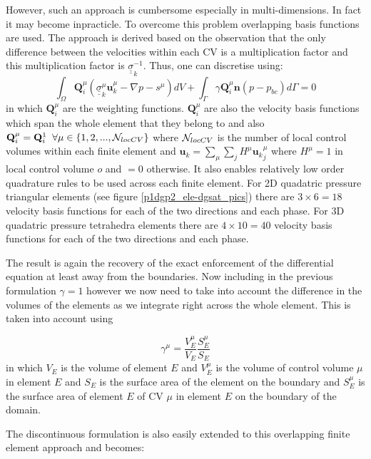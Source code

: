 However, such an approach is cumbersome especially in multi-dimensions.
In fact it may become inpracticle. To overcome this
problem overlapping basis functions are used. The approach is derived
based on the observation
that the only difference between the velocities
within each CV is a multiplication factor
and this multiplication factor is ${\underline {\underline \sigma}}_k^{-1}$.
Thus, one can discretise
using:
\begin{equation}
\int_\Omega {\mathbf Q}_i^\mu ({\underline{\underline\sigma}}_k^\mu {\mathbf u}_k^\mu - \nabla p -s^\mu) dV +
\int_{\Gamma}\gamma {\mathbf Q}_i^\mu {\mathbf n} (p-p_{bc}) d\Gamma =0
\label{overlap-eqn}
\end{equation}
in which ${\mathbf Q}_i^\mu$ are the weighting functions.
${\mathbf Q}_i^\mu$ are also the
velocity basis functions which span the whole
element that they belong to
and also ${\mathbf Q}_i^\mu={\mathbf Q}_i^1\;\; \forall \mu\in\{1,2,...,{\cal N}_{locCV}\}$
where ${\cal N}_{locCV}$ is the number of local control volumes within each
finite element and ${\mathbf u}_k =\sum_\mu \sum_j H^\mu {{\mathbf u}_k}_j^\mu$ where
$H^\mu=1$ in local control volume $o$ and $=0$ otherwise.
It also enables relatively low order quadrature rules to be used
across each finite element.
For 2D quadatric pressure triangular elements (see figure \ref{p1dgp2_ele-dgsat_pics})
there are $3\times6=18$ velocity basis
functions for each of the two directions and each phase.
For 3D quadatric pressure
tetrahedra elements there are $4\times 10=40$ velocity basis
functions for each of the two directions and each phase.

The result is again the recovery of the exact enforcement of
the differential equation at least away from the boundaries.
Now including in the previous formulation $\gamma=1$ however
we now need to take into account the difference in the
volumes of the elements as we integrate right
across the whole element. This is taken into account
using

\begin{equation}
\gamma^\mu = \frac{V^\mu_E}{V_E} \frac{S^\mu_E}{S_E}
\label{overlap-eqn-gamma}
\end{equation}
in which $V_E$ is the volume of element $E$
and $V^\mu_E$ is the volume of control volume $\mu$
in element $E$ and $S_E$ is the surface area of the element
on the boundary and $S^\mu_E$ is the surface
area of element $E$ of CV $\mu$ in element $E$ on the boundary
of the domain.

The discontinuous formulation is also easily extended
to this overlapping finite element approach and becomes:

